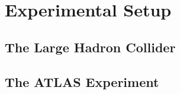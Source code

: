 \chapter{Experimental Setup}\label{cha:experimental_setup}

\section{The Large Hadron Collider}\label{sec:the_large_hadron_collider}

\section{The ATLAS Experiment}\label{sec:the_atlas_experiment}
